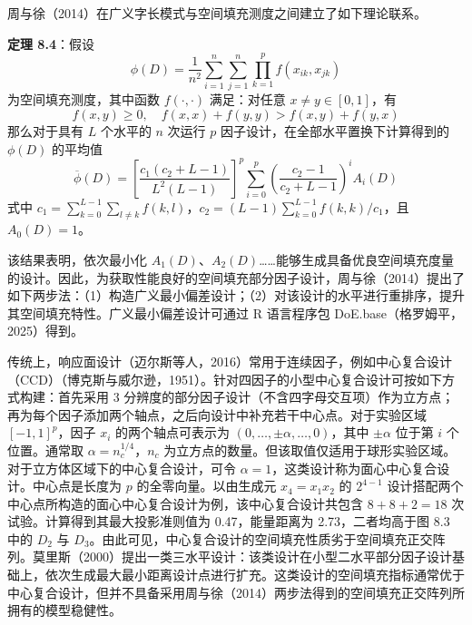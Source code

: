 \documentclass{ctexart}
\begin{document}
周与徐（2014）在广义字长模式与空间填充测度之间建立了如下理论联系。

\begin{mdquote}
\textbf{定理 8.4}：假设 \begin{equation*}
\phi(D)=\frac{1}{n^2}\sum_{i=1}^{n}\sum_{j=1}^{n}\prod_{k=1}^{p}f(x_{ik},x_{jk})
\end{equation*} 为空间填充测度，其中函数 $f(\cdot,\cdot)$ 满足：对任意 $x\neq y\in[0,1]$，有 \begin{equation*}
f(x,y)\ge 0,\quad f(x,x)+f(y,y)>f(x,y)+f(y,x)
\end{equation*} 那么对于具有 $L$ 个水平的 $n$ 次运行 $p$ 因子设计，在全部水平置换下计算得到的 $\phi(D)$ 的平均值 \begin{equation*}
\overline{\phi}(D)=\left[\frac{c_1(c_2+L-1)}{L^2(L-1)}\right]^p\sum_{i=0}^{p}\left(\frac{c_2-1}{c_2+L-1}\right)^iA_i(D)
\end{equation*} 式中 $c_1=\sum_{k=0}^{L-1}\sum_{l\neq k}f(k,l)$，$c_2=(L-1)\sum_{k=0}^{L-1}f(k,k)/c_1$，且 $A_0(D)=1$。
\end{mdquote}

该结果表明，依次最小化 $A_1(D)$、$A_2(D)$……能够生成具备优良空间填充度量的设计。因此，为获取性能良好的空间填充部分因子设计，周与徐（2014）提出了如下两步法：（1）构造广义最小偏差设计；（2）对该设计的水平进行重排序，提升其空间填充特性。广义最小偏差设计可通过 R 语言程序包 DoE.base（格罗姆平，2025）得到。

传统上，响应面设计（迈尔斯等人，2016）常用于连续因子，例如中心复合设计（CCD）（博克斯与威尔逊，1951）。针对四因子的小型中心复合设计可按如下方式构建：首先采用 3 分辨度的部分因子设计（不含四字母交互项）作为立方点；再为每个因子添加两个轴点，之后向设计中补充若干中心点。对于实验区域 $[-1,1]^p$，因子 $x_i$ 的两个轴点可表示为 $(0,\dots,\pm\alpha,\dots,0)$，其中 $\pm\alpha$ 位于第 $i$ 个位置。通常取 $\alpha=n_c^{1/4}$，$n_c$ 为立方点的数量。但该取值仅适用于球形实验区域。对于立方体区域下的中心复合设计，可令 $\alpha=1$，这类设计称为面心中心复合设计。中心点是长度为 $p$ 的全零向量。以由生成元 $x_4=x_1x_2$ 的 $2^{4-1}$ 设计搭配两个中心点所构造的面心中心复合设计为例，该中心复合设计共包含 $8+8+2=18$ 次试验。计算得到其最大投影准则值为 0.47，能量距离为 2.73，二者均高于图 8.3 中的 $D_2$ 与 $D_3$。由此可见，中心复合设计的空间填充性质劣于空间填充正交阵列。莫里斯（2000）提出一类三水平设计：该类设计在小型二水平部分因子设计基础上，依次生成最大最小距离设计点进行扩充。这类设计的空间填充指标通常优于中心复合设计，但并不具备采用周与徐（2014）两步法得到的空间填充正交阵列所拥有的模型稳健性。
\end{document}
